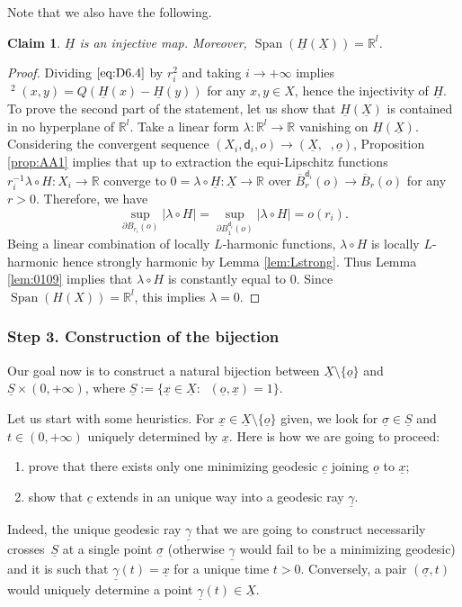 \documentclass[JEP,XML,SOM,Unicode,published]{cedram}
\let\backslash\setminus
\theoremstyle{plain}
\newtheorem{claim}[theorem]{Claim}
\theoremstyle{definition}
\newcommand{\setR}{\mathbb{R}}
\newcommand{\dist}{\mathsf{d}}
\DeclareMathOperator{\Span}{Span}
\newcommand{\uX}{\underline{X}}
\newcommand{\usigma}{\underline{\sigma}}
\DeclareMathOperator{\udist}{\underline{\dist}}
\newcommand{\uo}{\underline{o}}
\newcommand{\ux}{\underline{x}}
\newcommand{\uc}{\underline{c}}
\newcommand{\uH}{\underline{H}}
\newcommand{\uS}{\underline{S}}
\newcommand{\ugamma}{\underline{\gamma}}
\begin{document}
Note that we also have the following.

\begin{claim}\label{uclaim}
$\uH$ is an injective map. Moreover, $\Span(\uH(\uX)) = \setR^l$.
\end{claim}

\begin{proof}
Dividing $\eqref{eq:D6.4}$ by $r_i^2$ and taking $i\to+\infty$ implies $\udist^2(x,y) = Q(\uH(x)-\uH(y))$ for any $x,y \in X$, hence the injectivity of $\uH$. To prove the second part of the statement, let us show that $\uH(\uX)$ is contained in no hyperplane of $\setR^l$. Take a linear form $\lambda:\setR^l\to\setR$ vanishing on $\uH(\uX)$. Considering the convergent sequence $(X_i,\dist_i,o)\to(\uX,\udist,\uo)$, Proposition \ref{prop:AA1} implies that up to extraction the equi-Lipschitz functions $r_i^{-1} \lambda \circ H: X_i \to \setR$ converge to $0=\lambda \circ \uH: \uX \to \setR$ over $\overline{B}^{\dist_i}_r(o) \to\overline{B}_r(o)$ for any $r>0$. Therefore, we have\vspace*{-4pt}
\[
\sup_{\partial B_{r_i}(o)} |\lambda \circ H| = \sup_{\partial B_1^{\dist_i}(o)} |\lambda \circ H|= o(r_i).
\]
Being a linear combination of locally $L$-harmonic functions, $\lambda \circ H$ is locally $L$-harmonic hence strongly harmonic by Lemma \ref{lem:Lstrong}. Thus Lemma \ref{lem:0109} implies that $\lambda \circ H$ is constantly equal to $0$. Since $\Span(H(X))=\setR^l$, this implies $\lambda = 0$.
\end{proof}

\subsubsection*{Step 3. Construction of the bijection}

Our goal now is to construct a natural bijection between $\uX \backslash \{\uo\}$ and $\uS \times (0,+\infty)$, where $\uS:=\{\ux \in \uX: \udist(\uo,\ux)=1\}$.

Let us start with some heuristics. For $\ux \in \uX \backslash \{\uo\}$ given, we look for $\usigma \in \uS$ and $t\in(0,+\infty)$ uniquely determined by $\ux$. Here is how we are going to proceed:

\begin{enumerate}
\item
prove that there exists only one minimizing geodesic $\uc$ joining $\uo$ to $\ux$;

\item
show that $\uc$ extends in an unique way into a geodesic ray $\ugamma$.
\end{enumerate}
\noindent Indeed, the unique geodesic ray $\ugamma$ that we are going to construct necessarily crosses~$\uS$ at a single point $\usigma$ (otherwise $\ugamma$ would fail to be a minimizing geodesic) and it is such that $\ugamma(t)=\ux$ for a unique time $t>0$. Conversely, a pair $(\usigma,t)$ would uniquely determine a point $\ugamma(t) \in \uX$.
\end{document}
